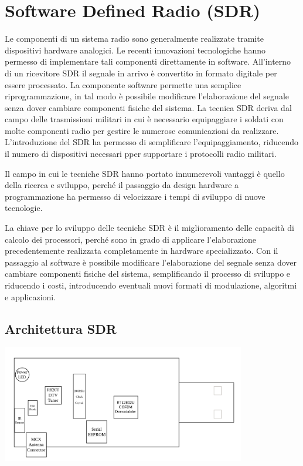 \section*{Software Defined Radio (SDR)}
Le componenti di un sistema radio sono generalmente realizzate tramite dispositivi hardware analogici.
Le recenti innovazioni tecnologiche hanno permesso di implementare tali componenti direttamente in software.
All'interno di un ricevitore SDR il segnale in arrivo è convertito in formato digitale per essere processato.
La componente software permette una semplice riprogrammazione, in tal modo è possibile modificare l'elaborazione del segnale senza dover cambiare componenti fisiche del sistema.
La tecnica SDR deriva dal campo delle trasmissioni militari in cui è necessario equipaggiare i soldati con molte componenti radio per gestire le numerose comunicazioni da realizzare.
L'introduzione del SDR ha permesso di semplificare l'equipaggiamento, riducendo il numero di dispositivi necessari pper supportare i protocolli radio militari.

Il campo in cui le tecniche SDR hanno portato innumerevoli vantaggi è quello della ricerca e sviluppo, perché il passaggio da design hardware a programmazione ha permesso di velocizzare i tempi di sviluppo di nuove tecnologie.

La chiave per lo sviluppo delle tecniche SDR è il miglioramento delle capacità di calcolo dei processori, perché sono in grado di applicare l'elaborazione precedentemente realizzata completamente in hardware specializzato.
Con il passaggio al software è possibile modificare l'elaborazione del segnale senza dover cambiare componenti fisiche del sistema, semplificando il processo di sviluppo e riducendo i costi, introducendo eventuali nuovi formati di modulazione, algoritmi e applicazioni.




\subsection*{Architettura SDR}

\begin{center}
    \includegraphics[width=0.8\textwidth]{imgs/sdr.png} 
\end{center}


